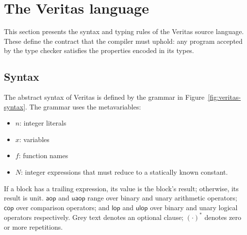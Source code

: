 \section{The Veritas language}\label{sec:source-language}

This section presents the syntax and typing rules of the Veritas source language. These define the contract that the compiler must uphold: any program accepted by the type checker satisfies the properties encoded in its types.

\subsection{Syntax}

The abstract syntax of Veritas is defined by the grammar in Figure~\ref{fig:veritas-syntax}. The grammar uses the metavariables:

\begin{itemize}
  \item $n$: integer literals
  \item $x$: variables
  \item $f$: function names
  \item $N$: integer expressions that must reduce to a statically known constant.
\end{itemize}

If a block has a trailing expression, its value is the block's result; otherwise, its result is unit. $\textsf{aop}$ and $\textsf{uaop}$ range over binary and unary arithmetic operators; $\textsf{cop}$ over comparison operators; and $\textsf{lop}$ and $\textsf{ulop}$ over binary and unary logical operators respectively. Grey text denotes an optional clause; $(\cdot)^*$ denotes zero or more repetitions.

